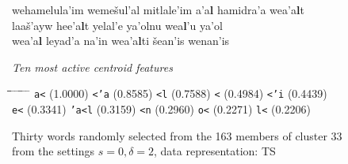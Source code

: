 \begin{figure}[!t]
\begin{mdframed}
\begin{normalsize}
\begin{tabbing}
wehamelula\a'{i}m \> weme\v{s}ul\a'{a}l \> mitlale\a'{i}m \> \textbf{}a\textbf{}\a'{a}\textbf{l} \> hamidra\a'{a} \> we\textbf{}a\textbf{}\a'{a}\textbf{l}t \\
laa\v{s}\a'{a}yw \> he\textbf{}e\textbf{}\a'{a}\textbf{l}t \> yelal\a'{e} \> ya\a'{o}lnu \> we\textbf{}a\textbf{}\textbf{l}\a'{u} \> ya\a'{o}l \\
we\textbf{}a\textbf{}\a'{a}\textbf{l} \> leyad\a'{a} \> na\a'{i}n \> we\textbf{}a\textbf{}\a'{a}\textbf{l}ti \> \v{s}ean\a'{i}s \> wenan\a'{i}s 
\end{tabbing}
\end{normalsize}
\vspace{-3pt}
\begin{mdframed}
\begin{small}
\textit{Ten most active centroid features}
\vspace{-3pt}
\begin{tabbing}
\hspace*{6ex}\= \hspace*{11ex}\= \hspace*{6ex}\= \hspace*{11ex} \= \hspace*{6ex} \= \hspace*{11ex} \= \hspace*{6ex}\= \hspace*{11ex} \= \hspace*{6ex} \= \hspace*{9.5ex}\kill
\texttt{a<} \> (1.0000) \> \texttt{<\a'{a}} \> (0.8585) \> \texttt{<l} \> (0.7588) \> \texttt{<} \> (0.4984) \> \texttt{<\a'{i}} \> (0.4439)\\
\texttt{e<} \> (0.3341) \> \texttt{\a'{a}<l} \> (0.3159) \> \texttt{<n} \> (0.2960) \> \texttt{o<} \> (0.2271) \> \texttt{l<} \> (0.2206)
\end{tabbing}
\end{small}
\end{mdframed}
\caption{Thirty words randomly selected from the 163 members of cluster 33 from the settings $s=0,\delta =2$, data representation: TS}
\label{fig:cluster-33-0-2-TS}
\end{mdframed}
\end{figure}

